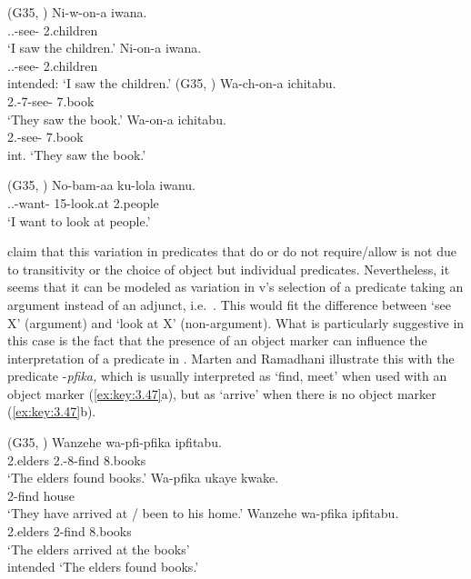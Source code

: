 \documentclass[output=paper]{langsci/langscibook}
\begin{document}
\ea\label{ex:key:3.44}  (G35, \citealt[264--265]{MartenRamadhani2001})
    \ea \label{bkm:Ref347659654}
	\gll	 Ni-w-on-a  iwana.\\
	        \Fsg.\Sm{}.\Om{}{}-see-\Fv{}  2.children\\
	\glt        ‘I saw the children.’
	\ex
    \gll	 \llap{*}Ni-on-a  iwana.\\
	        \Fsg.\Sm.\Tns{}{}-see-\Fv{}  2.children\\
	\glt        intended: ‘I saw the children.’
	\z
\z
\newpage
\ea\label{ex:key:3.45}  (G35, \citealt[264--265]{MartenRamadhani2001})
	\ea\label{bkm:Ref347659657}
	\gll	 Wa-ch-on-a  ichitabu.\\
	    2\Sm{}.\Tns{}-7\Om{}{}-see-\Fv{}  7.book\\
	\glt    ‘They saw the book.’
	\ex
    \gll	 \llap{*}Wa-on-a  ichitabu.\\
	    2\Sm{}.\Tns{}{}-see-\Fv{}  7.book\\
	\glt    int. ‘They saw the book.’
	\z
\z

\ea\label{ex:key:3.46}  (G35, \citealt[264--265]{MartenRamadhani2001}) \label{bkm:Ref347659685}
    \sn
    \gll No-bam-aa  ku-lola  iwanu.\\
    \Fsg.\Sm.\Tns{}{}-want-\Fv{}  15-look.at  2.people\\
    \glt ‘I want to look at people.’
\z

\citet{MartenRamadhani2001} claim that this variation in predicates that do or
do not require/allow  is not due to transitivity or the choice of
object but individual predicates. Nevertheless, it seems that it can be modeled
as variation in v’s selection of a predicate taking an argument instead of an
adjunct, i.e.\ . This would fit the difference between ‘see X’
(argument) and ‘look at X’ (non-argument). What is particularly suggestive in
this case is the fact that the presence of an object marker can influence the
interpretation of a predicate in . Marten and Ramadhani illustrate this
with the predicate -\emph{pfika,} which is usually interpreted as ‘find, meet’
when used with an object marker (\ref{ex:key:3.47}a), but as ‘arrive’ when there
is no object marker (\ref{ex:key:3.47}b).

\ea\label{ex:key:3.47}  (G35, \citealt[265--266]{MartenRamadhani2001})
    \ea \label{bkm:Ref347659728}
	\gll	 Wanzehe  wa-pfi-pfika  ipfitabu.\\
	    2.elders  2\Sm{}.\Tns{}-8\Om{}{}-find  8.books\\
	\glt    ‘The elders found books.’
	\ex
	\gll	 Wa-pfika  ukaye  kwake.\\
	    2\Sm{}-find  house  \Poss{}\\
	\glt    ‘They have arrived at / been to his home.’
    \ex
    \gll    {}Wanzehe  wa-pfika  ipfitabu.\\
            2.elders  2\Sm{}-find  8.books\\
    \glt        ‘The elders arrived at the books’\\
            intended ‘The elders found books.’
    \z
\z
\end{document}

